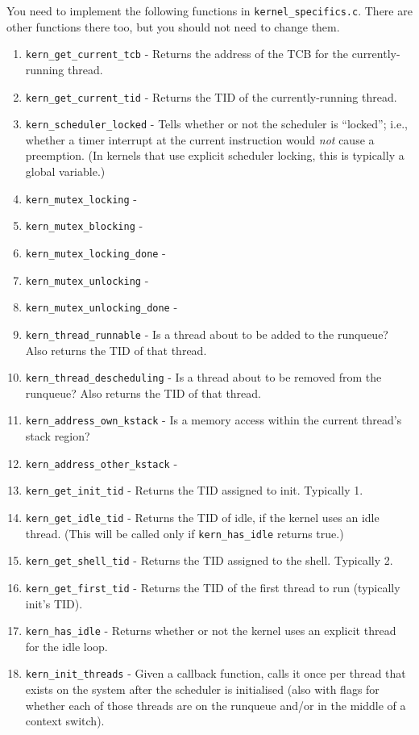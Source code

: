 \documentclass{article}
\begin{document}
You need to implement the following functions in \texttt{kernel\_specifics.c}. There are other functions there too, but you should not need to change them.
\begin{enumerate}
	\item \texttt{kern\_get\_current\_tcb} - Returns the address of the TCB for the currently-running thread.
	\item \texttt{kern\_get\_current\_tid} - Returns the TID of the currently-running thread.
	\item \texttt{kern\_scheduler\_locked} - Tells whether or not the scheduler is ``locked''; i.e., whether a timer interrupt at the current instruction would {\em not} cause a preemption. (In kernels that use explicit scheduler locking, this is typically a global variable.)
	\item \texttt{kern\_mutex\_locking} - 
	\item \texttt{kern\_mutex\_blocking} - 
	\item \texttt{kern\_mutex\_locking\_done} - 
	\item \texttt{kern\_mutex\_unlocking} - 
	\item \texttt{kern\_mutex\_unlocking\_done} - 
	\item \texttt{kern\_thread\_runnable} - Is a thread about to be added to the runqueue? Also returns the TID of that thread.
	\item \texttt{kern\_thread\_descheduling} - Is a thread about to be removed from the runqueue? Also returns the TID of that thread.
	\item \texttt{kern\_address\_own\_kstack} - Is a memory access within the current thread's stack region? %
	\item \texttt{kern\_address\_other\_kstack} - 
	\item \texttt{kern\_get\_init\_tid} - Returns the TID assigned to init. Typically 1.
	\item \texttt{kern\_get\_idle\_tid} - Returns the TID of idle, if the kernel uses an idle thread. (This will be called only if \texttt{kern\_has\_idle} returns true.)
	\item \texttt{kern\_get\_shell\_tid} - Returns the TID assigned to the shell. Typically 2.
	\item \texttt{kern\_get\_first\_tid} - Returns the TID of the first thread to run (typically init's TID).
	\item \texttt{kern\_has\_idle} - Returns whether or not the kernel uses an explicit thread for the idle loop.
	\item \texttt{kern\_init\_threads} - Given a callback function, calls it once per thread that exists on the system after the scheduler is initialised (also with flags for whether each of those threads are on the runqueue and/or in the middle of a context switch).

\end{enumerate}
\end{document}
